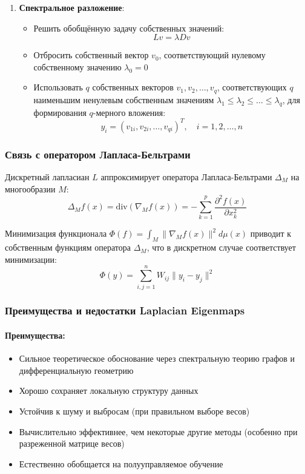 \documentclass[a4paper,12pt]{article}
\begin{document}
\begin{enumerate}
    \item \textbf{Спектральное разложение}:
    \begin{itemize}
        \item Решить обобщённую задачу собственных значений:
        \begin{equation}
            L v = \lambda D v
        \end{equation}
        \item Отбросить собственный вектор $v_0$, соответствующий нулевому собственному значению $\lambda_0 = 0$
        \item Использовать $q$ собственных векторов $v_1, v_2, \ldots, v_q$, соответствующих $q$ наименьшим ненулевым собственным значениям $\lambda_1 \leq \lambda_2 \leq \ldots \leq \lambda_q$, для формирования $q$-мерного вложения:
        \begin{equation}
            y_i = (v_{1i}, v_{2i}, \ldots, v_{qi})^T, \quad i = 1, 2, \ldots, n
        \end{equation}
    \end{itemize}
\end{enumerate}

\subsubsection{Связь с оператором Лапласа-Бельтрами}

Дискретный лапласиан $L$ аппроксимирует оператора Лапласа-Бельтрами $\Delta_M$ на многообразии $M$:
\begin{equation}
    \Delta_M f(x) = \text{div}(\nabla_M f(x)) = -\sum_{k=1}^p \frac{\partial^2 f(x)}{\partial x_k^2}
\end{equation}

Минимизация функционала $\Phi(f) = \int_M \|\nabla_M f(x)\|^2 d\mu(x)$ приводит к собственным функциям оператора $\Delta_M$, что в дискретном случае соответствует минимизации:
\begin{equation}
    \Phi(y) = \sum_{i,j=1}^n W_{ij} \|y_i - y_j\|^2
\end{equation}

\subsubsection{Преимущества и недостатки Laplacian Eigenmaps}

\paragraph{Преимущества:}
\begin{itemize}
    \item Сильное теоретическое обоснование через спектральную теорию графов и дифференциальную геометрию
    \item Хорошо сохраняет локальную структуру данных
    \item Устойчив к шуму и выбросам (при правильном выборе весов)
    \item Вычислительно эффективнее, чем некоторые другие методы (особенно при разреженной матрице весов)
    \item Естественно обобщается на полууправляемое обучение
\end{itemize}
\end{document}
